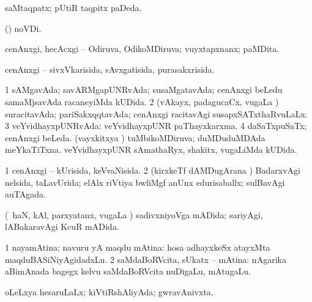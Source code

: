 {{{\bentry
{} 
\gl{\gu}
\expl{}
\bmng
saMtaqpatx; pUtiR taqpitx paDeda. 
\emng
\eentry

\bentry
{} 
\gl{\gu}
\expl{}
\bmng
{} (\pagu) noVDi. 
\emng
\eentry

\bentry 
{} 
\gl{\gu}
\expl{}
\bmng
cenAnxgi, hecAcxgi -- Odiruva, OdikoMDiruva; vuyxtapxnanx; paMDita. 
\emng
\eentry

\bentry
{} 
\gl{\gu}
\expl{}
\bmng
cenAnxgi -- sivxVkarisida, sAvxgatisida, purasakxrisida. 
\emng
\eentry

\bentry
{} 
\gl{\gu}
\expl{}
\bmng
\bnum
\num{1} sAMgavAda; savARMgapUNRvAda; susaMgatavAda; cenAnxgi beLedu samaMjsavAda racaneyiMda kUDida. 
\num{2} (vAkayx, padagucaCx, \mo vugaLa \vi) suracitavAda; pariSakxqqtavAda; cenAnxgi racitavAgi susapxSATxthaRvuLaLx. 
\num{3} veYvidhayxpUNRvAda:  veYvidhayxpUNR paThayxkarxma. 
\num{4} daSaTxpuSaTx; cenAnxgi beLeda. 
 (vayxkitxya \vi) 
\banum
{} tuMbikoMDiruva; duMDuduMDAda meYkaTiTxna. 
 veYvidhayxpUNR sAmathaRyx, shakitx, \mo vugaLiMda kUDida. 
\eanum
\numie
\enum
\emng
\eentry

\bentry
{} 
\gl{\gu}
\expl{}
\bmng
\bnum
\num{1} cenAnxgi -- kUrisida, keVvaNisida. 
\num{2} (kirxkeTf dAMDugArana \vi) BadarxvAgi nelsida, taLavUrida; elAlx riVtiya bwliMgf anUnx edurisaballx; sulBavAgi auTAgada. 
\enum
\emng
\eentry

\bentry
{} 
\gl{\gu}
\expl{}
\bmng
(\kanmu\ haN, kAl, parxyatanx, \mo vugaLa \vi) sadivxniyoVga mADida; sariyAgi, lABakaravAgi KcuR mADida. 
\emng
\eentry

\bentry
{} 
\gl{\gu}
\expl{}
\bmng
\bnum
\num{1} nayamAtina; navuru yA maqdu mAtina:  hosa adhayxkeSx atayxMta maqduBASiNiyAgidadxLu. 
\num{2} saMdaBoRVcita, sUkatx -- mAtina:  nAgarika aBimAnada bagegx kelvu saMdaBoRVcita nuDigaLu, mAtugaLu. 
\enum
\emng
\eentry

\bentry
{} 
\gl{\nA}
\expl{}
\bmng
{} 
\emng
\eentry

\bentry
{} 
\gl{\gu}
\expl{}
\bmng
oLeLxya hesaruLaLx; kiVtiRshAliyAda; gwravAnivxta. 
\emng
\eentry

}}}
